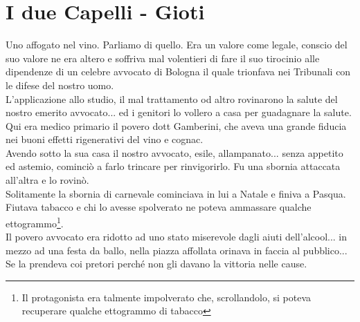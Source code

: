 
\chapter{I due Capelli - Gioti}
Uno affogato nel vino. Parliamo di quello. Era un valore come legale, conscio del suo valore ne era altero e soffriva mal volentieri di fare il suo tirocinio alle dipendenze di un celebre avvocato di Bologna il quale trionfava nei Tribunali con le difese del nostro uomo.\\
\indent L'applicazione allo studio, il mal trattamento od altro rovinarono la salute del nostro emerito avvocato... ed i genitori lo vollero a casa per guadagnare la salute.\\
\indent Qui era medico primario il povero dott Gamberini, che aveva una grande fiducia nei buoni effetti rigenerativi del vino e cognac.\\
\indent Avendo sotto la sua casa il nostro avvocato, esile, allampanato... senza appetito ed astemio, cominciò a farlo trincare per rinvigorirlo. Fu una sbornia attaccata all'altra e lo rovinò.\\
\indent Solitamente la sbornia di carnevale cominciava in lui a Natale e finiva a Pasqua. Fiutava tabacco e chi lo avesse spolverato ne poteva ammassare qualche ettogrammo\footnote{Il protagonista era talmente impolverato che, scrollandolo, si poteva recuperare qualche ettogrammo di tabacco}.\\
\indent Il povero avvocato era ridotto ad uno stato miserevole dagli aiuti dell'alcool... in mezzo ad una festa da ballo, nella piazza affollata orinava in faccia al pubblico...\\
\indent Se la prendeva coi pretori perché non gli davano la vittoria nelle cause.\\

